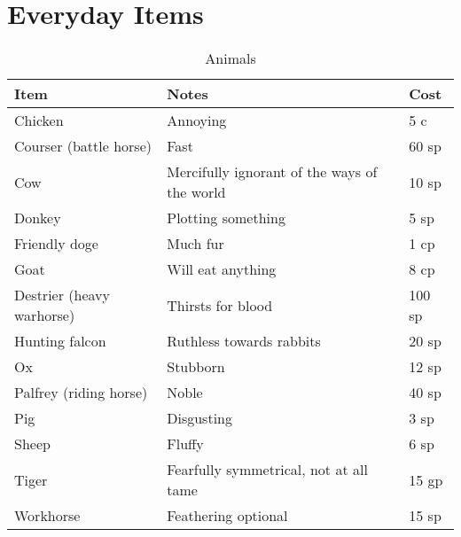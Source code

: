 \documentclass[oneside,11pt,english]{book}
\begin{document}
\section{Everyday Items}
\begin{table}[hb]
  \centering
  \caption{Animals}
  \label{tab:Animals}
  \begin{tabu} spread 0pt {*{3}{X[-1]}}
    Item                      & Notes                                        & Cost   \\\toprule
    Chicken                   & Annoying                                     & 5 c    \\
    Courser (battle horse)    & Fast                                         & 60 sp  \\
    Cow                       & Mercifully ignorant of the ways of the world & 10 sp  \\
    Donkey                    & Plotting something                           & 5 sp   \\
    Friendly doge             & Much fur                                     & 1 cp   \\
    Goat                      & Will eat anything                            & 8 cp   \\
    Destrier (heavy warhorse) & Thirsts for blood                            & 100 sp \\
    Hunting falcon            & Ruthless towards rabbits                     & 20 sp  \\
    Ox                        & Stubborn                                     & 12 sp  \\
    Palfrey (riding horse)    & Noble                                        & 40 sp  \\
    Pig                       & Disgusting                                   & 3 sp   \\
    Sheep                     & Fluffy                                       & 6 sp   \\
    Tiger                     & Fearfully symmetrical, not at all tame       & 15 gp  \\
    Workhorse                 & Feathering optional                          & 15 sp  \\
  \end{tabu}
\end{table}
\end{document}
